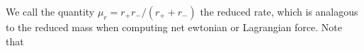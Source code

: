 We call the quantity \(\mu_r = r_+r_-/(r_+ + r_-)\) the reduced rate, which is analagous to the reduced mass when computing net ewtonian or Lagrangian force.  Note that